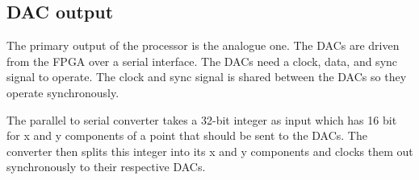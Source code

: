 \subsection{DAC output}

The primary output of the processor is the analogue one. The DACs are driven from the FPGA over a serial interface. The DACs need a clock, data, and sync signal to operate. The clock and sync signal is shared between the DACs so they operate synchronously. 

The parallel to serial converter takes a 32-bit integer as input which has 16 bit for x and y components of a point that should be sent to the DACs. The converter then splits this integer into its x and y components and clocks them out synchronously to their respective DACs.